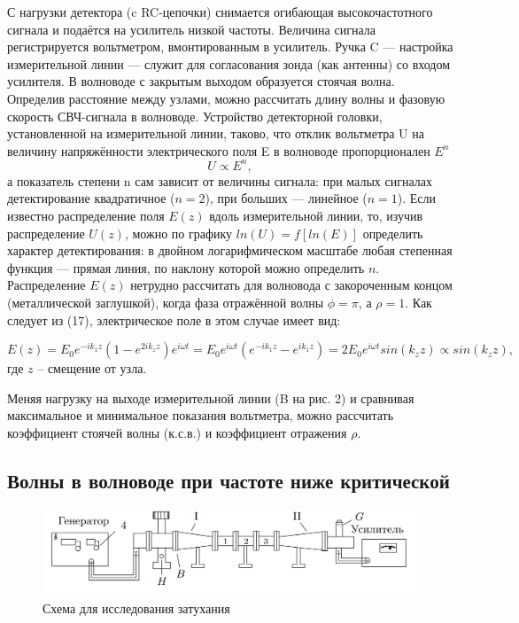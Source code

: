 \documentclass[a4paper]{article}
\begin{document}
С нагрузки детектора (c RC-цепочки) снимается огибающая высокочастотного сигнала и подаётся на усилитель низкой частоты. Величина сигнала регистрируется вольтметром, вмонтированным в усилитель. Ручка C — настройка измерительной линии — служит для согласования зонда (как антенны) со входом усилителя.
В волноводе с закрытым выходом образуется стоячая волна. Определив расстояние между узлами, можно рассчитать длину волны
и фазовую скорость СВЧ-сигнала в волноводе. Устройство детекторной головки, установленной на измерительной линии, таково, что отклик вольтметра U на величину напряжённости электрического поля E в волноводе пропорционален $E^n$
\begin{equation}
    U \propto E^n,
\end{equation}
а показатель степени n сам зависит от величины сигнала: при малых
сигналах детектирование квадратичное ($n = 2$), при больших — линейное ($n = 1$). Если известно распределение поля $E(z)$ вдоль измерительной линии, то, изучив распределение $U(z)$, можно по графику $ln(U) = f[ln(E)]$ определить характер детектирования: в двойном логарифмическом масштабе любая степенная функция — прямая линия, по наклону которой можно определить $n$. Распределение $E(z)$ нетрудно рассчитать для волновода с закороченным концом (металлической заглушкой), когда фаза отражённой волны $\phi = \pi$, а $\rho = 1$. Как следует из (17), электрическое поле в этом случае имеет вид:

\begin{equation}
    E(z) = E_0 e^{-ik_1 z}(1 - e^{2ik_z z})e^{i\omega t} = E_0 e^{i\omega t}(e^{-ik_1 z} - e^{ik_1 z}) = 2E_0 e^{i\omega t} sin(k_z z) \propto sin(k_z z),
\end{equation}
где $z$ -- смещение от узла. \par
Меняя нагрузку на выходе измерительной линии (B на рис. 2) и сравнивая максимальное и минимальное показания вольтметра, можно рассчитать
коэффициент стоячей волны (к.с.в.) и коэффициент отражения $\rho$.

\subsection{Волны в волноводе при частоте ниже критической}

\begin{figure}[h]
    \centering
    \includegraphics[width=\textwidth]{fig3.PNG}
    \caption{Схема для исследования затухания}
    \label{fig:vac}
\end{figure}
\end{document}

